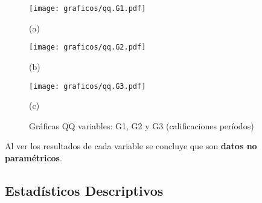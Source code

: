 \documentclass{article}
\begin{document}
\begin{figure}[h]
    \centering
    \begin{minipage}[b]{0.3\textwidth}
        \centering
        \texttt{[image: graficos/qq.G1.pdf]}
        \caption*{(a)}
    \end{minipage}
    \hspace{0.03\textwidth}
    \begin{minipage}[b]{0.3\textwidth}
        \centering
        \texttt{[image: graficos/qq.G2.pdf]}
        \caption*{(b)}
    \end{minipage}
    \hspace{0.03\textwidth}
    \begin{minipage}[b]{0.3\textwidth}
        \centering
        \texttt{[image: graficos/qq.G3.pdf]}
        \caption*{(c)}
    \end{minipage}

    \caption{Gráficas QQ variables: G1, G2 y G3 (calificaciones períodos)}
    \label{fig:tres-graficos}
\end{figure}


Al ver los resultados de cada variable se concluye que son \textbf{datos no paramétricos}.

\subsection*{Estadísticos Descriptivos}
\end{document}
